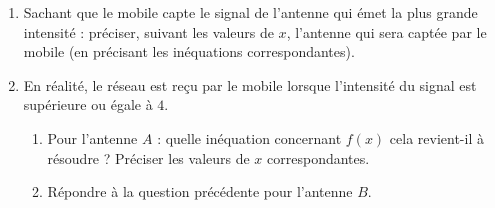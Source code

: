 \begin{exo}{}
\begin{enumerate}[resume]
		\item Sachant que le mobile capte le signal de l'antenne qui émet la plus grande intensité : préciser, suivant les valeurs de $x$, l'antenne qui sera captée par le mobile (en précisant les inéquations correspondantes).
		\item En réalité, le réseau est reçu par le mobile lorsque l'intensité du signal est supérieure ou égale à $4$.
		      \begin{enumerate}
			      \item Pour l'antenne $A$ : quelle inéquation concernant $f(x)$ cela revient-il à résoudre ? Préciser les valeurs de $x$ correspondantes.
			      \item Répondre à la question précédente pour l'antenne $B$.
		      \end{enumerate}
	\end{enumerate}
\end{exo}
